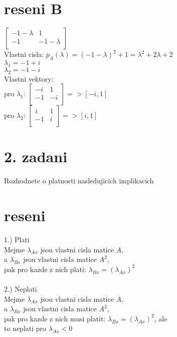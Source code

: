 \documentclass[a4paper]{article}
\begin{document}
\section*{reseni B}
$
\left[\begin{matrix}
	-1-\lambda & 1\\
	-1 & -1-\lambda\\
\end{matrix}\right]
$\\
Vlastni cisla:
$p_A(\lambda) = (-1-\lambda)^2+1=\lambda^2+2\lambda+2$\\
$\lambda_1 = -1+i$\\
$\lambda_2 = -1-i$\\
Vlastni vektory:\\
pro $\lambda_1$: 
$\left[\begin{matrix}
	-i & 1\\
	-1 & -i\\
\end{matrix}\right]
=> [-i,1]$
\\
pro $\lambda_2$: 
$\left[\begin{matrix}
	i & 1\\
	-1 & i\\
\end{matrix}\right]
=> [i,1]$
\\




\section*{2. zadani}
Rozhodnete o platnosti nasledujicich implikacich


\section*{reseni}
1.) Plati\\
Mejme $\lambda_{Ax}$ jsou vlastni cisla matice $A$,\\
a $\lambda_{Bx}$ jsou vlastni cisla matice $A^2$,\\
pak pro kazde z nich plati: $\lambda_{Bx}=(\lambda_{Ax})^2$
\\\\
2.) Neplati\\
Mejme $\lambda_{Ax}$ jsou vlastni cisla matice $A$,\\
a $\lambda_{Bx}$ jsou vlastni cisla matice $A^2$,\\
pak pro kazde z nich musi platit: $\lambda_{Bx}=(\lambda_{Ax})^2$, ale\\
to neplati pro $\lambda_{Ax} < 0$
\end{document}
